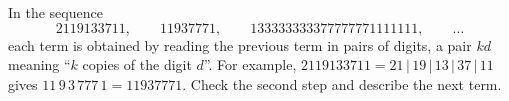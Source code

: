 In the sequence
\[2119133711,\qquad11937771,\qquad133333333377777771111111,\qquad\dots\]
each term is obtained by reading the previous term in pairs of digits, a pair $kd$ meaning ``$k$ copies of the digit $d$''. For example, $2119133711=21\,|\,19\,|\,13\,|\,37\,|\,11$ gives $11\,9\,3\,777\,1=11937771$. Check the second step and describe the next term.
